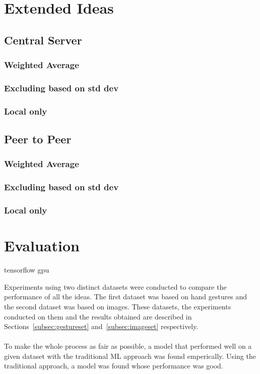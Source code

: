 \documentclass[12pt]{article}
\begin{document}
\section{Extended Ideas}\label{sec:ext-ideas}
\subsection{Central Server}
\subsubsection{Weighted Average}
\subsubsection{Excluding based on std dev}
\subsubsection{Local only}
\subsection{Peer to Peer}
\subsubsection{Weighted Average}
\subsubsection{Excluding based on std dev}
\subsubsection{Local only}
\clearpage

\section{Evaluation}\label{sec:experiments}


tensorflow gpu


Experiments using two distinct datasets were conducted to compare the performance of all the ideas. The first dataset was based on hand gestures and the second dataset was based on images. These datasets, the experiments conducted on them and the results obtained are described in Sections~\ref{subsec:gestureset} and~\ref{subsec:imageset} respectively.
\\\\
To make the whole process as fair as possible, a model that performed well on a given dataset with the traditional ML approach was found emperically. Using the traditional approach, a model was found whose performance was good.
\end{document}
